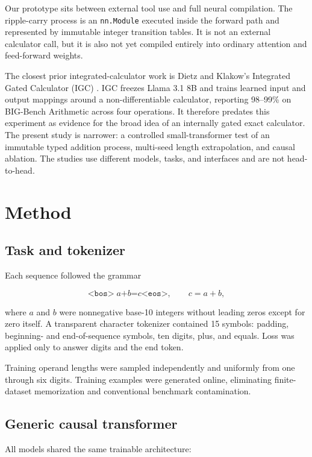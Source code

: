 \documentclass[11pt]{article}
\begin{document}
Our prototype sits between external tool use and full neural compilation. The
ripple-carry process is an \texttt{nn.Module} executed inside the forward path
and represented by immutable integer transition tables. It is not an external
calculator call, but it is also not yet compiled entirely into ordinary
attention and feed-forward weights.

The closest prior integrated-calculator work is Dietz and Klakow's Integrated
Gated Calculator (IGC) \cite{dietz2025igc}. IGC freezes Llama 3.1 8B and
trains learned input and output mappings around a non-differentiable
calculator, reporting 98--99\% on BIG-Bench Arithmetic across four
operations. It therefore predates this experiment as evidence for the broad
idea of an internally gated exact calculator. The present study is narrower:
a controlled small-transformer test of an immutable typed addition process,
multi-seed length extrapolation, and causal ablation. The studies use different
models, tasks, and interfaces and are not head-to-head.

\section{Method}

\subsection{Task and tokenizer}

Each sequence followed the grammar

\[
\texttt{<bos>}\;a\texttt{+}b\texttt{=}c\texttt{<eos>},
\qquad c=a+b,
\]

where \(a\) and \(b\) were nonnegative base-10 integers without leading zeros
except for zero itself. A transparent character tokenizer contained 15 symbols:
padding, beginning- and end-of-sequence symbols, ten digits, plus, and equals.
Loss was applied only to answer digits and the end token.

Training operand lengths were sampled independently and uniformly from one
through six digits. Training examples were generated online, eliminating
finite-dataset memorization and conventional benchmark contamination.

\subsection{Generic causal transformer}

All models shared the same trainable architecture:
\end{document}
